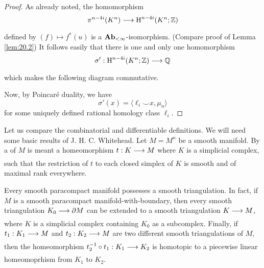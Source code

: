 \documentclass[../main]{subfiles}
\begin{document}
\begin{proof}
As already noted, the homomorphism \[\pi^{n-4i}(K^n) \varrightarrow{} \homology^{n-4i}(K^n;\mathbb{Z})\] defined by $(f) \mapsto f^\ast(u)$ is a $\mathbf{Ab}_{<\infty}$-isomorphism. (Compare proof of Lemma \ref{lem:20.2}) It follows easily that there is one and only one homomorphism \[\sigma':\homology^{n-4i}(K^n;\mathbb{Z}) \varrightarrow{} \mathbb{Q}\] which makes the following diagram commutative. 

\begin{center}
\end{center}

Now, by Poincaré duality, we have \[\sigma'(x) = \langle \ell_i \smile x, \mu_n \rangle\] for some uniquely defined rational homology class $\ell_i$.
\end{proof}

Let us compare the combinatorial and differentiable definitions. We will need some basic results of J. H. C. Whitehead. Let $M = M^n$ be a smooth manifold. By a  of $M$ is meant a homeomorphism $t:K \varrightarrow{} M$ where $K$ is a simplicial complex, such that the restriction of $t$ to each closed simplex of $K$ is smooth and of maximal rank everywhere.

\begin{theorem*}
Every smooth paracompact manifold possesses a smooth triangulation. In fact, if $M$ is a smooth paracompact manifold-with-boundary, then every smooth triangulation $K_0 \varrightarrow{} \partial M$ can be extended to a smooth triangulation $K \varrightarrow{} M$, where $K$ is a simplicial complex containing $K_0$ as a subcomplex. Finally, if $t_1:K_1 \varrightarrow{} M$ and $t_2:K_2 \varrightarrow{} M$ are two different smooth triangulations of $M$, then the homeomorphism $t_2^{-1} \circ t_1: K_1 \varrightarrow{} K_2$ is homotopic to a piecewise linear homeomoprhism from $K_1$ to $K_2$.
\end{theorem*}
\end{document}
